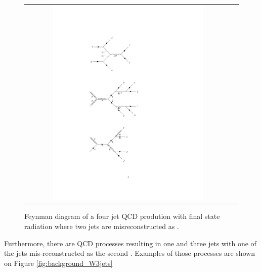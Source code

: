 \begin{figure}[tbh!]
	\centering
	\begin{tabular}{cc}
		\includegraphics[width=0.75\textwidth]{diagrams/pics/background_QCDfinrad.pdf}
	\end{tabular}
	\caption{Feynman diagram of a four jet QCD prodution with final state radiation where two jets are misreconstructed as \hadtau. }
	\label{fig:background_QCDfinrad}
\end{figure}

Furthermore, there are QCD processes resulting in one \hadtau and three jets with one of the jets mis-reconstructed as the second \hadtau. Examples of those processes are shown on Figure \ref{fig:background_W3jets}

